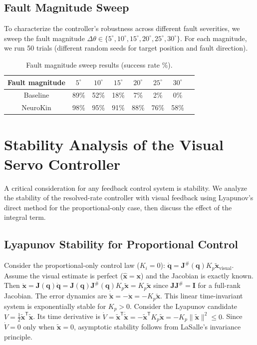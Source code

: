 \documentclass[12pt,a4paper,oneside]{report}
\begin{document}
\subsection{Fault Magnitude Sweep}

To characterize the controller's robustness across different fault severities, we sweep the fault magnitude $\Delta \theta \in \{5^\circ, 10^\circ, 15^\circ, 20^\circ, 25^\circ, 30^\circ\}$. For each magnitude, we run 50 trials (different random seeds for target position and fault direction).

\begin{table}[H]
\centering
\caption{Fault magnitude sweep results (success rate \%).}
\label{tab:fault_sweep}
\begin{tabular}{cccccccc}
\toprule
Fault magnitude & $5^\circ$ & $10^\circ$ & $15^\circ$ & $20^\circ$ & $25^\circ$ & $30^\circ$ \\
\midrule
Baseline & 89\% & 52\% & 18\% & 7\% & 2\% & 0\% \\
NeuroKin & 98\% & 95\% & 91\% & 88\% & 76\% & 58\% \\
\bottomrule
\end{tabular}
\end{table}

\section{Stability Analysis of the Visual Servo Controller}

A critical consideration for any feedback control system is stability. We analyze the stability of the resolved-rate controller with visual feedback using Lyapunov's direct method for the proportional-only case, then discuss the effect of the integral term.

\subsection{Lyapunov Stability for Proportional Control}

Consider the proportional-only control law ($K_i = 0$): $\dot{\mathbf{q}} = \mathbf{J}^{\#}(\mathbf{q}) K_p \tilde{\mathbf{x}}_{\text{visual}}$. Assume the visual estimate is perfect ($\hat{\mathbf{x}} = \mathbf{x}$) and the Jacobian is exactly known. Then $\dot{\mathbf{x}} = \mathbf{J}(\mathbf{q}) \dot{\mathbf{q}} = \mathbf{J}(\mathbf{q}) \mathbf{J}^{\#}(\mathbf{q}) K_p \tilde{\mathbf{x}} = K_p \tilde{\mathbf{x}}$ since $\mathbf{J} \mathbf{J}^{\#} = \mathbf{I}$ for a full-rank Jacobian. The error dynamics are $\dot{\tilde{\mathbf{x}}} = -\dot{\mathbf{x}} = -K_p \tilde{\mathbf{x}}$. This linear time-invariant system is exponentially stable for $K_p > 0$. Consider the Lyapunov candidate $V = \frac{1}{2} \tilde{\mathbf{x}}^{\mathsf{T}} \tilde{\mathbf{x}}$. Its time derivative is $\dot{V} = \tilde{\mathbf{x}}^{\mathsf{T}} \dot{\tilde{\mathbf{x}}} = -\tilde{\mathbf{x}}^{\mathsf{T}} K_p \tilde{\mathbf{x}} = -K_p \|\tilde{\mathbf{x}}\|^2 \leq 0$. Since $\dot{V} = 0$ only when $\tilde{\mathbf{x}} = 0$, asymptotic stability follows from LaSalle's invariance principle.
\end{document}
